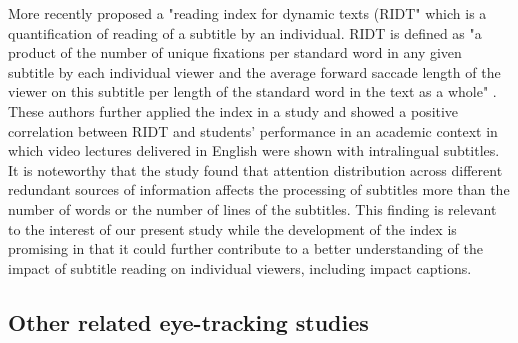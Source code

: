 \documentclass[output=paper]{langsci/langscibook}
\begin{document}
More recently \citet{Kruger2014} proposed a "reading index for dynamic texts (RIDT" which is a quantification of reading of a subtitle by an individual. RIDT is defined as "a product of the number of unique fixations per standard word in any given subtitle by each individual viewer and the average forward saccade length of the viewer on this subtitle per length of the standard word in the text as a whole" \citep[pg. 110]{Kruger2014}.  These authors further applied the index in a study and showed a positive correlation between RIDT and students' performance in an academic context in which video lectures delivered in English were shown with intralingual subtitles. It is noteworthy that the study found that attention distribution across different redundant sources of information affects the processing of subtitles more than the number of words or the number of lines of the subtitles. This finding is relevant to the interest of our present study while the development of the index is promising in that it could further contribute to a better understanding of the impact of subtitle reading on individual viewers, including impact captions.


\subsection{Other related eye-tracking studies}
\end{document}
